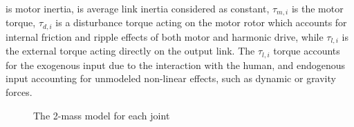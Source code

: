 \DIFdelbegin {}\DIFdelend \DIFaddbegin {}\DIFaddend is motor inertia, \DIFdelbegin {}\DIFdelend \DIFaddbegin {}\DIFaddend is average link inertia considered as constant, $\tau_{m,i}$ is the motor torque, $\tau_{d,i}$ is a disturbance torque acting on the motor rotor  which accounts for internal friction and ripple effects of both motor and harmonic drive, while $\tau_{l,i}$ is the external torque acting directly on the output link. The $\tau_{l,i}$ torque accounts for the 
exogenous input due to the interaction  with the human, and endogenous input accounting for unmodeled non-linear effects, such as dynamic or gravity forces.
\begin{figure}[ht]
	\centering
	\DIFdelbeginFL %
\DIFdelendFL %
	\DIFaddbeginFL \def\svgwidth{0.7\columnwidth}
	\begin{footnotesize}
		
	\end{footnotesize}
	\DIFaddendFL \caption{The 2-mass model for each joint\DIFaddbeginFL {}\DIFaddendFL }
	\label{fig:exos_singlejoint_model}
\end{figure}
